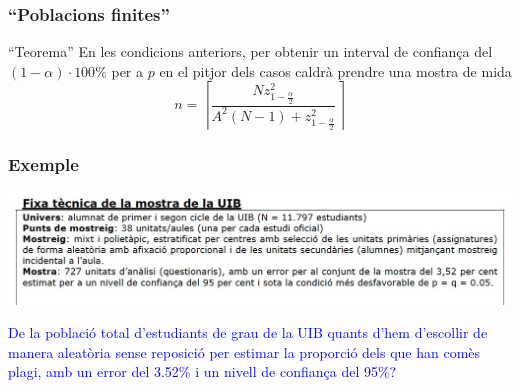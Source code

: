 \documentclass[12pt,t]{beamer}
\newcommand{\blue}[1]{\textcolor{blue}{#1}}
\theoremstyle{plain}
\theoremstyle{definition}
\begin{document}
\begin{frame}
\frametitle{``Poblacions finites''}

\begin{block}{``Teorema''}
En les condicions anteriors, per obtenir un interval de confiança del $(1-\alpha)\cdot 100\%$ per a $p$ en el pitjor dels casos caldrà prendre una mostra de mida
$$
n=\left\lceil\frac{Nz_{1-\frac{\alpha}{2}}^2}{A^2(N-1)+z_{1-\frac{\alpha}{2}}^2}\right\rceil
$$
\end{block}
\end{frame}

\begin{frame}
\frametitle{Exemple}
\vspace*{-5ex}

\begin{center}
\hspace*{-0.5cm}\includegraphics[width=1.1\linewidth]{plagiUIB2.jpg}
\end{center}

\blue{De la població total d'estudiants de grau de la UIB quants d'hem d'escollir de manera aleatòria sense reposició per estimar la proporció dels que han comès plagi, amb un error del 3.52\% i un nivell de confiança del 95\%?}
\end{frame}
\end{document}
